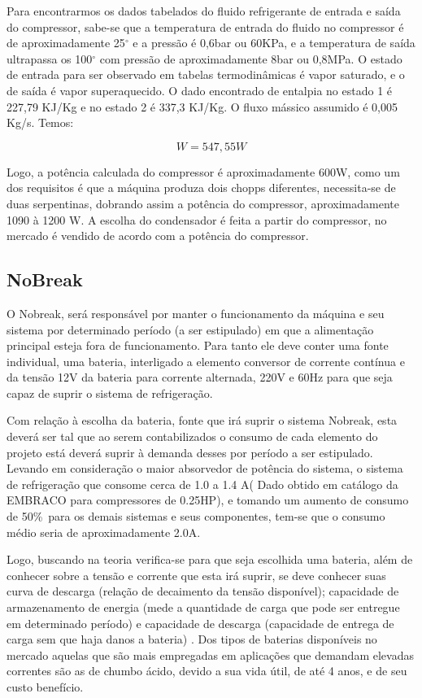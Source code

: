 			Para encontrarmos os dados tabelados do fluido refrigerante de entrada e saída do compressor, sabe-se que a temperatura de entrada do fluido no compressor é de aproximadamente 25$^\circ$ e a pressão é 0,6bar ou 60KPa, e a temperatura de saída ultrapassa os 100$^\circ$ com pressão de aproximadamente 8bar ou 0,8MPa. O estado de entrada para ser observado em tabelas termodinâmicas é vapor saturado, e o de saída é vapor superaquecido. O dado encontrado de entalpia no estado 1 é 227,79 KJ/Kg e no estado 2 é 337,3 KJ/Kg. O fluxo mássico assumido é 0,005 Kg/s. Temos:

			\begin{equation}
				W = 547,55 W 
			\end{equation}

			Logo, a potência calculada do compressor é aproximadamente 600W, como um dos requisitos é que a máquina produza dois chopps diferentes, necessita-se de duas serpentinas, dobrando assim a potência do compressor, aproximadamente 1090 à 1200 W.
			A escolha do condensador é feita a partir do compressor, no mercado é vendido de acordo com a potência do compressor. 


		\subsection[NoBreak]{NoBreak}
			O Nobreak, será responsável por manter o funcionamento da máquina e seu sistema por determinado período (a ser estipulado) em que a alimentação principal esteja fora de funcionamento. Para tanto ele deve conter uma fonte individual, uma bateria, interligado a elemento conversor de corrente contínua e da tensão 12V da bateria  para corrente alternada, 220V e 60Hz para que seja capaz de suprir o sistema de refrigeração.

			Com relação à escolha da bateria, fonte que irá suprir o sistema Nobreak, esta deverá ser tal que ao serem contabilizados o consumo de cada elemento do projeto está deverá suprir à demanda desses por período a ser estipulado. Levando em consideração o maior absorvedor de potência do sistema, o sistema de refrigeração que consome cerca de 1.0 a 1.4 A( Dado obtido em catálogo da EMBRACO para compressores de 0.25HP), e tomando um aumento de consumo de 50\%\ para os demais sistemas e seus componentes, tem-se que o consumo médio seria de aproximadamente 2.0A.

			Logo, buscando na teoria verifica-se para que seja escolhida uma bateria, além de conhecer sobre a tensão e corrente que esta irá suprir, se deve conhecer suas curva de descarga (relação de decaimento da tensão disponível); capacidade de armazenamento de energia (mede a quantidade de carga que pode ser entregue em determinado período) e capacidade de descarga (capacidade de entrega de carga sem que haja danos a bateria) \cite{meggi}. Dos tipos de baterias disponíveis no mercado aquelas que são mais empregadas em aplicações que demandam elevadas correntes são as de chumbo ácido, devido a sua vida útil, de até 4 anos, e de seu custo benefício. 
			
